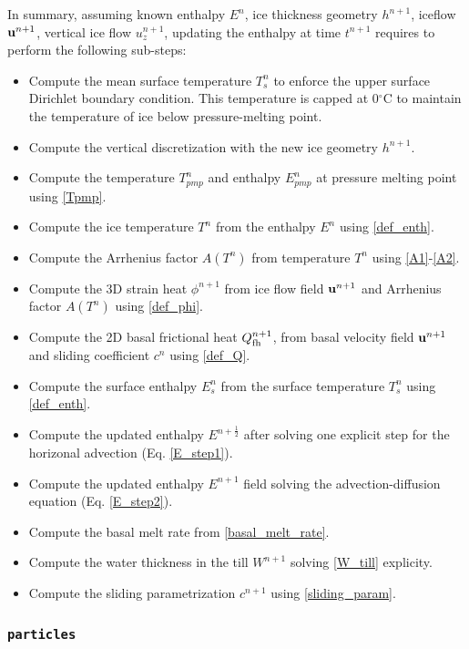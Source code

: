 \documentclass[10pt,twocolumn]{article}
\begin{document}
In summary, assuming known enthalpy $E^n$, ice thickness geometry $h^{n+1}$, iceflow ${\bf u}^{n+1}$,
vertical ice flow $u^{n+1}_z$, updating the enthalpy at time $t^{n+1}$ requires to perform the following sub-steps:
\begin{itemize}
\item Compute the mean surface temperature $T^n_s$ to enforce the upper surface Dirichlet 
boundary condition. This temperature is capped at 0$^{\circ}$C to maintain the temperature 
of ice below pressure-melting point.
\item Compute the vertical discretization with the new ice geometry $h^{n+1}$.
\item Compute the temperature $T_{pmp}^n$ and enthalpy $E_{pmp}^n$ at pressure melting point
using \eqref{Tpmp}.
\item Compute the ice temperature $T^n$ from the enthalpy $E^n$ using \eqref{def_enth}.
\item Compute the Arrhenius factor $A(T^n)$ from temperature $T^n$ using \eqref{A1}-\eqref{A2}.
\item Compute the 3D strain heat $\phi^{n+1}$ from ice flow field ${\bf u}^{n+1}$ 
and Arrhenius factor $A(T^n)$ using \eqref{def_phi}.
\item Compute the 2D basal frictional heat $Q_{\rm fh}^{n+1}$, from basal velocity field 
${\bf u}^{n+1}$ and sliding coefficient $c^n$ using \eqref{def_Q}.
\item Compute the surface enthalpy $E^n_s$ from the surface temperature $T^n_s$
 using \eqref{def_enth}.
\item Compute the updated enthalpy $E^{n+\frac12}$ after solving one explicit step for 
the horizonal advection (Eq. \eqref{E_step1}).
\item Compute the updated enthalpy $E^{n+1}$ field solving the 
advection-diffusion equation (Eq. \eqref{E_step2}).
\item Compute the basal melt rate from \eqref{basal_melt_rate}.
\item Compute the water thickness in the till $W^{n+1}$ solving \eqref{W_till} explicity.
\item Compute the sliding parametrization $c^{n+1}$ using \eqref{sliding_param}.
\end{itemize}

\subsubsection{\texttt{particles}}
\label{module_particles}
\end{document}
